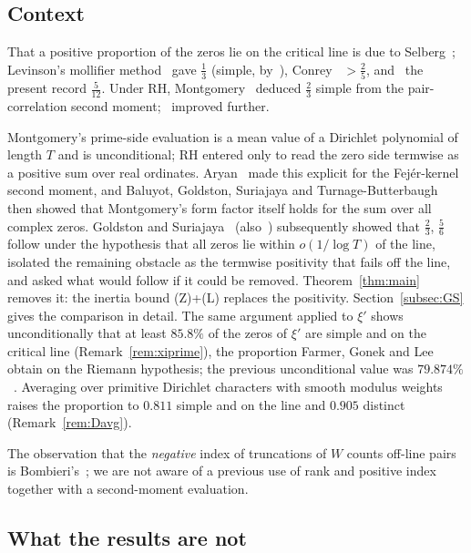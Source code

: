 \documentclass[11pt]{amsart}
\theoremstyle{definition}
\theoremstyle{remark}
\numberwithin{equation}{section}
\begin{document}
\subsection{Context}\label{subsec:history}

That a positive proportion of the zeros lie on the critical line is due to Selberg~\cite{Sel42}; Levinson's mollifier method~\cite{Lev74} gave $\tfrac13$ (simple, by~\cite{HB79}), Conrey~\cite{Con89} $>\!\tfrac25$, and~\cite{BCY11,Fen12,PRZZ20} the present record $\tfrac5{12}$. Under RH, Montgomery~\cite{Mon73} deduced $\tfrac23$ simple from the pair-correlation second moment;~\cite{Mon75,CG93,BHB13,CGdL20} improved further.

Montgomery's prime-side evaluation is a mean value of a Dirichlet polynomial of length $T$ and is unconditional; RH entered only to read the zero side termwise as a positive sum over real ordinates. Aryan~\cite{Ary22} made this explicit for the Fej\'er-kernel second moment, and Baluyot, Goldston, Suriajaya and Turnage-Butterbaugh~\cite{BGSTB24} then showed that Montgomery's form factor itself holds for the sum over all complex zeros. Goldston and Suriajaya~\cite{GS25,GS26} (also~\cite{BGSTB25,GLSS25}) subsequently showed that $\tfrac23$, $\tfrac56$ follow under the hypothesis that all zeros lie within $o(1/\log T)$ of the line, isolated the remaining obstacle as the termwise positivity that fails off the line, and asked what would follow if it could be removed. Theorem~\ref{thm:main} removes it: the inertia bound (Z)+(L) replaces the positivity. Section~\ref{subsec:GS} gives the comparison in detail.
The same argument applied to $\xi'$ shows unconditionally that at least $85.8\%$ of the zeros of $\xi'$ are simple and on the critical line (Remark~\ref{rem:xiprime}), the proportion Farmer, Gonek and Lee~\cite{FGL14} obtain on the Riemann hypothesis; the previous unconditional value was $79.874\%$~\cite{Con89}.
Averaging over primitive Dirichlet characters with smooth modulus weights raises the proportion to $0.811$ simple and on the line and $0.905$ distinct (Remark~\ref{rem:Davg}).

The observation that the \emph{negative} index of truncations of $W$ counts off-line pairs is Bombieri's~\cite{Bom00}; we are not aware of a previous use of rank and positive index together with a second-moment evaluation.

\subsection{What the results are not}\label{subsec:arenot}
\end{document}

